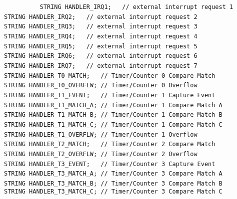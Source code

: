 {{{{\lstinline!          STRING HANDLER_IRQ1;	// external interrupt request 1! \newline
\lstinline!          STRING HANDLER_IRQ2;	// external interrupt request 2! \newline
\lstinline!          STRING HANDLER_IRQ3;	// external interrupt request 3! \newline
\lstinline!          STRING HANDLER_IRQ4;	// external interrupt request 4! \newline
\lstinline!          STRING HANDLER_IRQ5;	// external interrupt request 5! \newline
\lstinline!          STRING HANDLER_IRQ6;	// external interrupt request 6! \newline
\lstinline!          STRING HANDLER_IRQ7;	// external interrupt request 7! \newline
\lstinline!          ! \newline
\lstinline!          STRING HANDLER_T0_MATCH;	// Timer/Counter 0 Compare Match! \newline
\lstinline!          STRING HANDLER_T0_OVERFLW;	// Timer/Counter 0 Overflow! \newline
\lstinline!          STRING HANDLER_T1_EVENT;	// Timer/Counter 1 Capture Event! \newline
\lstinline!          STRING HANDLER_T1_MATCH_A;	// Timer/Counter 1 Compare Match A! \newline
\lstinline!          STRING HANDLER_T1_MATCH_B;	// Timer/Counter 1 Compare Match B! \newline
\lstinline!          STRING HANDLER_T1_MATCH_C;	// Timer/Counter 1 Compare Match C! \newline
\lstinline!          STRING HANDLER_T1_OVERFLW;	// Timer/Counter 1 Overflow! \newline
\lstinline!          STRING HANDLER_T2_MATCH;	// Timer/Counter 2 Compare Match! \newline
\lstinline!          STRING HANDLER_T2_OVERFLW;	// Timer/Counter 2 Overflow! \newline
\lstinline!          STRING HANDLER_T3_EVENT;	// Timer/Counter 3 Capture Event! \newline
\lstinline!          STRING HANDLER_T3_MATCH_A;	// Timer/Counter 3 Compare Match A! \newline
\lstinline!          STRING HANDLER_T3_MATCH_B;	// Timer/Counter 3 Compare Match B! \newline
\lstinline!          STRING HANDLER_T3_MATCH_C;	// Timer/Counter 3 Compare Match C! \newline
}}}}
